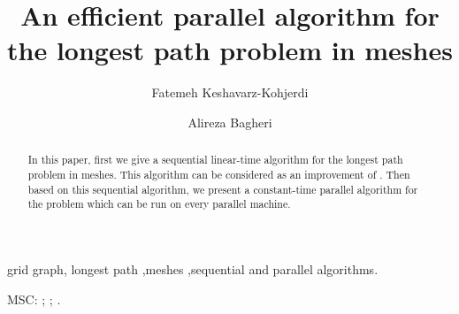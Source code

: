 \documentclass[preprint,12pt]{elsarticle}
\begin{document}
\begin{frontmatter}





\title{An efficient parallel algorithm for the longest path problem in meshes}

\address[label1]{Corresponding author: fatemeh.keshavarz@aut.ac.ir
}
\address[label2]{ ar\_bagheri@aut.ac.ir}


\author{Fatemeh Keshavarz-Kohjerdi }
\address{Department of Computer Engineering,\\ Islamic Azad University,
    North Tehran Branch, Tehran, Iran.\\}

\author{Alireza Bagheri }

\address{Department of Computer Engineering \& IT,\\ Amirkabir University of Technology, Tehran, Iran.}

\begin{abstract}
In this paper, first we give a sequential linear-time algorithm for
the longest path problem in meshes. This algorithm can be considered
as an improvement of \cite{FAA:ALAFFLPIRGG}. Then based on this
sequential algorithm, we present a constant-time parallel algorithm
for the problem which can be run on every parallel machine.
\end{abstract}

\begin{keyword} grid graph, longest path
\sep meshes \sep sequential and parallel algorithms.

MSC: ; ; .

\end{keyword}

\end{frontmatter}
\end{document}

